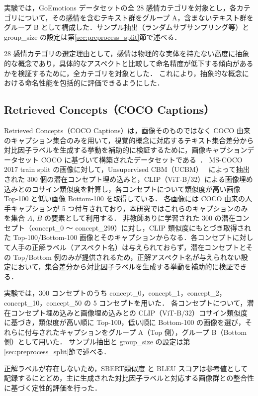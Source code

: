 実験では，GoEmotions データセットの全 28 感情カテゴリを対象とし，各カテゴリについて，その感情を含むテキスト群をグループ A，含まないテキスト群をグループ B として構成した．サンプル抽出（ランダムサブサンプリング等）と group\_size の設定は第\ref{sec:preprocess_split}節で述べる．

28 感情カテゴリの選定理由として，感情は物理的な実体を持たない高度に抽象的な概念であり，具体的なアスペクトと比較して命名精度が低下する傾向があるかを検証するために，全カテゴリを対象とした．
これにより，抽象的な概念における命名性能を包括的に評価できるようにした．

\subsection{Retrieved Concepts（COCO Captions）}
Retrieved Concepts（COCO Captions）は，画像そのものではなく COCO 由来のキャプション集合のみを用いて，視覚的概念に対応するテキスト集合差分から対比因子ラベルを生成する挙動を補助的に検証するために，画像キャプションデータセット COCO に基づいて構築されたデータセットである~\cite{lin2014microsoft}．
MS-COCO 2017 train split の画像に対して，Unsupervised CBM（UCBM）~\cite{schrodi2024unsupervised} によって抽出された 300 個の潜在コンセプト埋め込みと，CLIP（ViT-B/32）による画像埋め込みとのコサイン類似度を計算し，各コンセプトについて類似度が高い画像 Top-100 と低い画像 Bottom-100 を取得している．
各画像には COCO 由来の人手キャプションが 5 つ付与されており，本研究ではこれらのキャプションのみを集合 $A$, $B$ の要素として利用する．
非教師ありに学習された 300 の潜在コンセプト（concept\_0 ～ concept\_299）に対し，CLIP 類似度にもとづき取得された Top-100/Bottom-100 画像とそのキャプションからなる．各コンセプトに対して人手の正解ラベル（アスペクト名）は与えられておらず，潜在コンセプトとその Top/Bottom 例のみが提供されるため，正解アスペクト名が与えられない設定において，集合差分から対比因子ラベルを生成する挙動を補助的に検証できる．

実験では，300 コンセプトのうち concept\_0，concept\_1，concept\_2，concept\_10，concept\_50 の 5 コンセプトを用いた．
各コンセプトについて，潜在コンセプト埋め込みと画像埋め込みとの CLIP（ViT-B/32）コサイン類似度に基づき，類似度が高い順に Top-100，低い順に Bottom-100 の画像を選び，それらに付与されたキャプションをグループ A（Top 側），グループ B（Bottom 側）として用いた．
サンプル抽出と group\_size の設定は第\ref{sec:preprocess_split}節で述べる．

正解ラベルが存在しないため，SBERT類似度 と BLEU スコアは参考値として記録するにとどめ，主に生成された対比因子ラベルと対応する画像群との整合性に基づく定性的評価を行った．

